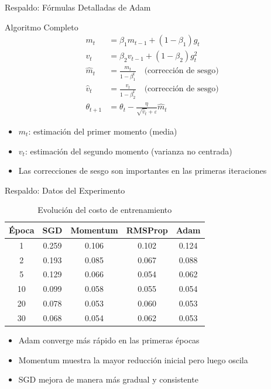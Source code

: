 \documentclass[10pt]{beamer}
\begin{document}
\appendix

\begin{frame}{Respaldo: Fórmulas Detalladas de Adam}
\begin{block}{Algoritmo Completo}
\begin{align}
m_t &= \beta_1 m_{t-1} + (1-\beta_1) g_t \\
v_t &= \beta_2 v_{t-1} + (1-\beta_2) g_t^2 \\
\hat{m}_t &= \frac{m_t}{1-\beta_1^t} \quad \text{(corrección de sesgo)} \\
\hat{v}_t &= \frac{v_t}{1-\beta_2^t} \quad \text{(corrección de sesgo)} \\
\theta_{t+1} &= \theta_t - \frac{\eta}{\sqrt{\hat{v}_t} + \varepsilon} \hat{m}_t
\end{align}
\end{block}

\begin{itemize}
\item $m_t$: estimación del primer momento (media)
\item $v_t$: estimación del segundo momento (varianza no centrada)
\item Las correcciones de sesgo son importantes en las primeras iteraciones
\end{itemize}
\end{frame}

\begin{frame}{Respaldo: Datos del Experimento}
\begin{table}[ht]
\centering
\footnotesize
\begin{tabular}{c|cccc}
\toprule
\textbf{Época} & \textbf{SGD} & \textbf{Momentum} & \textbf{RMSProp} & \textbf{Adam} \\
\midrule
1 & 0.259 & 0.106 & 0.102 & 0.124 \\
2 & 0.193 & 0.085 & 0.067 & 0.088 \\
5 & 0.129 & 0.066 & 0.054 & 0.062 \\
10 & 0.099 & 0.058 & 0.055 & 0.054 \\
20 & 0.078 & 0.053 & 0.060 & 0.053 \\
30 & 0.068 & 0.054 & 0.062 & 0.053 \\
\bottomrule
\end{tabular}
\caption{Evolución del costo de entrenamiento}
\end{table}

\begin{itemize}
\item Adam converge más rápido en las primeras épocas
\item Momentum muestra la mayor reducción inicial pero luego oscila
\item SGD mejora de manera más gradual y consistente
\end{itemize}
\end{frame}
\end{document}
